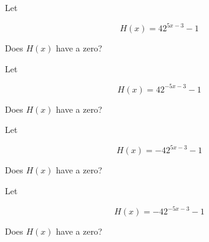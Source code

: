 \documentclass{ximera}
\author{Lee Wayand}
\begin{document}
\begin{exercise}


\begin{question}



Let 

\[
H(x) = 4 2^{5x - 3} - 1
\]


Does $H(x)$ have a zero?


\begin{multipleChoice}
\end{multipleChoice}

\end{question}







\begin{question}



Let 

\[
H(x) = 4 2^{-5x - 3} - 1
\]


Does $H(x)$ have a zero?


\begin{multipleChoice}
\end{multipleChoice}

\end{question}





\begin{question}



Let 

\[
H(x) = -4 2^{5x - 3} - 1
\]


Does $H(x)$ have a zero?


\begin{multipleChoice}
\end{multipleChoice}

\end{question}








\begin{question}



Let 

\[
H(x) = -4 2^{-5x - 3} - 1
\]


Does $H(x)$ have a zero?


\begin{multipleChoice}
\end{multipleChoice}

\end{question}








\end{exercise}
\end{document}
